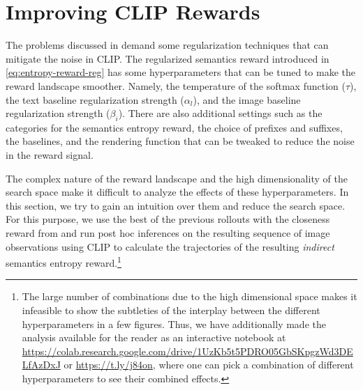 
\section{Improving CLIP Rewards}
\label{sec:improving-rewards}

The problems discussed in  demand some regularization techniques that can mitigate the noise in CLIP.
The regularized semantics reward introduced in  \eqref{eq:entropy-reward-reg} has some hyperparameters that can be tuned to make the reward landscape smoother.
Namely, the temperature of the softmax function (\(\tau\)), the text baseline regularization strength (\(\alpha_{l}\)), and the image baseline regularization strength (\(\beta_{i}\)).
There are also additional settings such as the categories for the semantics entropy reward, the choice of prefixes and suffixes, the baselines, and the rendering function that can be tweaked to reduce the noise in the reward signal.

The complex nature of the reward landscape and the high dimensionality of the search space make it difficult to analyze the effects of these hyperparameters.
In this section, we try to gain an intuition over them and reduce the search space.
For this purpose, we use the best of the previous rollouts with the closeness reward from  and run post hoc inferences on the resulting sequence of image observations using CLIP to calculate the trajectories of the resulting \emph{indirect} semantics entropy reward.\footnote{The large number of combinations due to the high dimensional space makes it infeasible to show the subtleties of the interplay between the different hyperparameters in a few figures.
Thus, we have additionally made the analysis available for the reader as an interactive notebook at \url{https://colab.research.google.com/drive/1UzKb5t5PDRO05GbSKpgzWd3DELfAzDxJ} or \url{https://t.ly/j84on}, where one can pick a combination of different hyperparameters to see their combined effects.}

